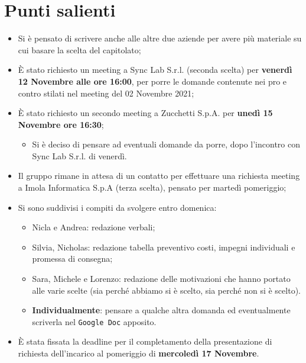 \documentclass[11pt]{article}
\begin{document}
	\newpage

	\section{Punti salienti}
		\begin{itemize}
			\item Si è pensato di scrivere anche alle altre due aziende per avere più materiale
			su cui basare la scelta del capitolato;
			\item È stato richiesto un meeting a Sync Lab S.r.l. (seconda scelta) per \textbf{venerdì 12 Novembre alle ore 16:00},
			per porre le domande contenute nei pro e contro stilati nel meeting del 02 Novembre 2021;
			\item È stato richiesto un secondo meeting a Zucchetti S.p.A. per \textbf{unedì 15 Novembre ore 16:30};
			\begin{itemize}
				\item Si è deciso di pensare ad eventuali domande da porre, dopo l'incontro con Sync Lab S.r.l. di venerdì.
			\end{itemize}
			\item Il gruppo rimane in attesa di un contatto per effettuare una richiesta meeting a Imola Informatica S.p.A
			(terza scelta), pensato per martedì pomeriggio;
			\item Si sono suddivisi i compiti da svolgere entro domenica:
				\begin{itemize}
					\item Nicla e Andrea: redazione verbali;
					\item Silvia, Nicholas: redazione tabella preventivo costi, impegni individuali e promessa di consegna;
					\item Sara, Michele e Lorenzo: redazione delle motivazioni che hanno portato alle varie scelte (sia perché
					abbiamo si è scelto, sia perché non si è scelto).
					\item \textbf{Individualmente}: pensare a qualche altra domanda ed eventualmente scriverla nel
					\texttt{Google Doc} apposito.
				\end{itemize}
			\item È stata fissata la deadline per il completamento della presentazione di richiesta dell'incarico al pomeriggio
			di \textbf{mercoledì 17 Novembre}.
		\end{itemize}
	
	

	
	
	
	
	
	
	
	
\end{document}

